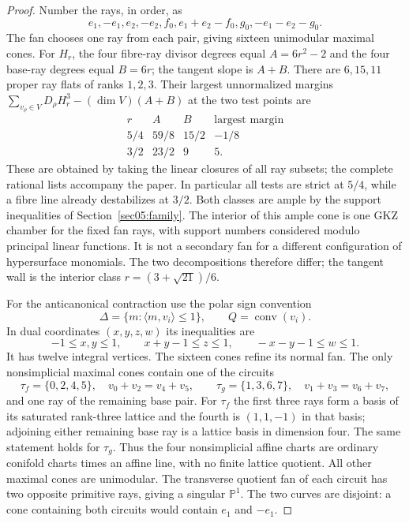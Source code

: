 \documentclass[11pt]{amsart}
\theoremstyle{definition}
\theoremstyle{remark}
\newcommand{\PP}{\mathbb P}
\begin{document}
\begin{proof}
Number the rays, in order, as
\begin{equation}\label{eq11:rays}
 e_1,-e_1,e_2,-e_2,f_0,e_1+e_2-f_0,g_0,-e_1-e_2-g_0.
\end{equation}
The fan chooses one ray from each pair, giving sixteen unimodular
maximal cones. For $H_r$, the four fibre-ray divisor degrees equal
$A=6r^2-2$ and the four base-ray degrees equal $B=6r$; the tangent
slope is $A+B$. There are $6,15,11$ proper ray flats of ranks
$1,2,3$. Their largest unnormalized margins
$\sum_{v_\rho\in V}D_\rho H_r^3-(\dim V)(A+B)$ at the two
test points are
\[
\begin{array}{c|ccc}
r&A&B&\text{largest margin}\\\hline
5/4&59/8&15/2&-1/8\\
3/2&23/2&9&5.
\end{array}
\]
These are obtained by taking the linear closures of all ray subsets;
the complete rational lists accompany the paper. In particular all
tests are strict at $5/4$, while a fibre line already destabilizes at
$3/2$. Both classes are ample by the support inequalities of
Section~\ref{sec05:family}. The interior of this ample cone is one
GKZ chamber for the fixed fan rays, with support numbers considered
modulo principal linear functions. It is not a secondary fan for a
different configuration of hypersurface monomials. The two decompositions
therefore differ; the tangent wall is the interior class
$r=(3+\sqrt{21})/6$.

For the anticanonical contraction use the polar sign convention
\[
 \Delta=\{m:\langle m,v_i\rangle\le1\},\qquad Q=\operatorname{conv}(v_i).
\]
In dual coordinates $(x,y,z,w)$ its inequalities are
\begin{equation}\label{eq11:polar}
 -1\le x,y\le1,\qquad x+y-1\le z\le1,\qquad
 -x-y-1\le w\le1.
\end{equation}
It has twelve integral vertices. The sixteen cones refine its normal
fan. The only nonsimplicial maximal cones contain one of the circuits
\begin{equation}\label{eq11:circuits}
 \tau_f=\{0,2,4,5\},\quad v_0+v_2=v_4+v_5,
 \qquad
 \tau_g=\{1,3,6,7\},\quad v_1+v_3=v_6+v_7,
\end{equation}
and one ray of the remaining base pair. For $\tau_f$ the first three
rays form a basis of its saturated rank-three lattice and the fourth
is $(1,1,-1)$ in that basis; adjoining either remaining base ray is
a lattice basis in dimension four. The same statement holds for
$\tau_g$. Thus the four nonsimplicial affine charts are ordinary
conifold charts times an affine line, with no finite lattice quotient.
All other maximal cones are unimodular. The transverse quotient fan
of each circuit has two opposite primitive rays, giving a singular
$\PP^1$. The two curves are disjoint: a cone containing both circuits
would contain $e_1$ and $-e_1$.


\end{proof}
\end{document}

